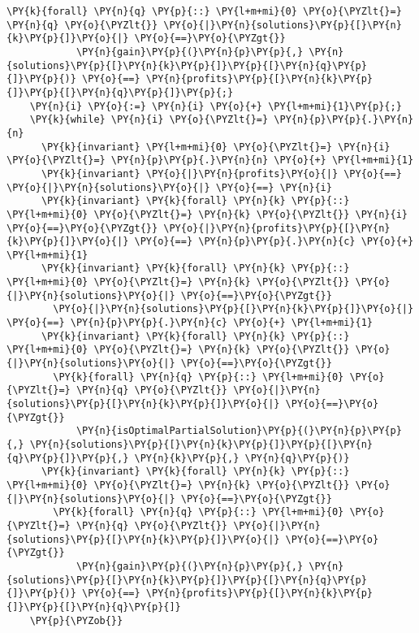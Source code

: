 \begin{sloppypar}
\begin{Verbatim}[commandchars=\\\{\}]
        \PY{k}{forall} \PY{n}{q} \PY{p}{::} \PY{l+m+mi}{0} \PY{o}{\PYZlt{}=} \PY{n}{q} \PY{o}{\PYZlt{}} \PY{o}{|}\PY{n}{solutions}\PY{p}{[}\PY{n}{k}\PY{p}{]}\PY{o}{|} \PY{o}{==}\PY{o}{\PYZgt{}} 
            \PY{n}{gain}\PY{p}{(}\PY{n}{p}\PY{p}{,} \PY{n}{solutions}\PY{p}{[}\PY{n}{k}\PY{p}{]}\PY{p}{[}\PY{n}{q}\PY{p}{]}\PY{p}{)} \PY{o}{==} \PY{n}{profits}\PY{p}{[}\PY{n}{k}\PY{p}{]}\PY{p}{[}\PY{n}{q}\PY{p}{]}\PY{p}{;}
    \PY{n}{i} \PY{o}{:=} \PY{n}{i} \PY{o}{+} \PY{l+m+mi}{1}\PY{p}{;}
    \PY{k}{while} \PY{n}{i} \PY{o}{\PYZlt{}=} \PY{n}{p}\PY{p}{.}\PY{n}{n} 
      \PY{k}{invariant} \PY{l+m+mi}{0} \PY{o}{\PYZlt{}=} \PY{n}{i} \PY{o}{\PYZlt{}=} \PY{n}{p}\PY{p}{.}\PY{n}{n} \PY{o}{+} \PY{l+m+mi}{1}
      \PY{k}{invariant} \PY{o}{|}\PY{n}{profits}\PY{o}{|} \PY{o}{==} \PY{o}{|}\PY{n}{solutions}\PY{o}{|} \PY{o}{==} \PY{n}{i}
      \PY{k}{invariant} \PY{k}{forall} \PY{n}{k} \PY{p}{::} \PY{l+m+mi}{0} \PY{o}{\PYZlt{}=} \PY{n}{k} \PY{o}{\PYZlt{}} \PY{n}{i} \PY{o}{==}\PY{o}{\PYZgt{}} \PY{o}{|}\PY{n}{profits}\PY{p}{[}\PY{n}{k}\PY{p}{]}\PY{o}{|} \PY{o}{==} \PY{n}{p}\PY{p}{.}\PY{n}{c} \PY{o}{+} \PY{l+m+mi}{1}
      \PY{k}{invariant} \PY{k}{forall} \PY{n}{k} \PY{p}{::} \PY{l+m+mi}{0} \PY{o}{\PYZlt{}=} \PY{n}{k} \PY{o}{\PYZlt{}} \PY{o}{|}\PY{n}{solutions}\PY{o}{|} \PY{o}{==}\PY{o}{\PYZgt{}} 
        \PY{o}{|}\PY{n}{solutions}\PY{p}{[}\PY{n}{k}\PY{p}{]}\PY{o}{|} \PY{o}{==} \PY{n}{p}\PY{p}{.}\PY{n}{c} \PY{o}{+} \PY{l+m+mi}{1}
      \PY{k}{invariant} \PY{k}{forall} \PY{n}{k} \PY{p}{::} \PY{l+m+mi}{0} \PY{o}{\PYZlt{}=} \PY{n}{k} \PY{o}{\PYZlt{}} \PY{o}{|}\PY{n}{solutions}\PY{o}{|} \PY{o}{==}\PY{o}{\PYZgt{}} 
        \PY{k}{forall} \PY{n}{q} \PY{p}{::} \PY{l+m+mi}{0} \PY{o}{\PYZlt{}=} \PY{n}{q} \PY{o}{\PYZlt{}} \PY{o}{|}\PY{n}{solutions}\PY{p}{[}\PY{n}{k}\PY{p}{]}\PY{o}{|} \PY{o}{==}\PY{o}{\PYZgt{}} 
            \PY{n}{isOptimalPartialSolution}\PY{p}{(}\PY{n}{p}\PY{p}{,} \PY{n}{solutions}\PY{p}{[}\PY{n}{k}\PY{p}{]}\PY{p}{[}\PY{n}{q}\PY{p}{]}\PY{p}{,} \PY{n}{k}\PY{p}{,} \PY{n}{q}\PY{p}{)}
      \PY{k}{invariant} \PY{k}{forall} \PY{n}{k} \PY{p}{::} \PY{l+m+mi}{0} \PY{o}{\PYZlt{}=} \PY{n}{k} \PY{o}{\PYZlt{}} \PY{o}{|}\PY{n}{solutions}\PY{o}{|} \PY{o}{==}\PY{o}{\PYZgt{}} 
        \PY{k}{forall} \PY{n}{q} \PY{p}{::} \PY{l+m+mi}{0} \PY{o}{\PYZlt{}=} \PY{n}{q} \PY{o}{\PYZlt{}} \PY{o}{|}\PY{n}{solutions}\PY{p}{[}\PY{n}{k}\PY{p}{]}\PY{o}{|} \PY{o}{==}\PY{o}{\PYZgt{}} 
            \PY{n}{gain}\PY{p}{(}\PY{n}{p}\PY{p}{,} \PY{n}{solutions}\PY{p}{[}\PY{n}{k}\PY{p}{]}\PY{p}{[}\PY{n}{q}\PY{p}{]}\PY{p}{)} \PY{o}{==} \PY{n}{profits}\PY{p}{[}\PY{n}{k}\PY{p}{]}\PY{p}{[}\PY{n}{q}\PY{p}{]}
    \PY{p}{\PYZob{}}

\end{Verbatim}
\end{sloppypar}
